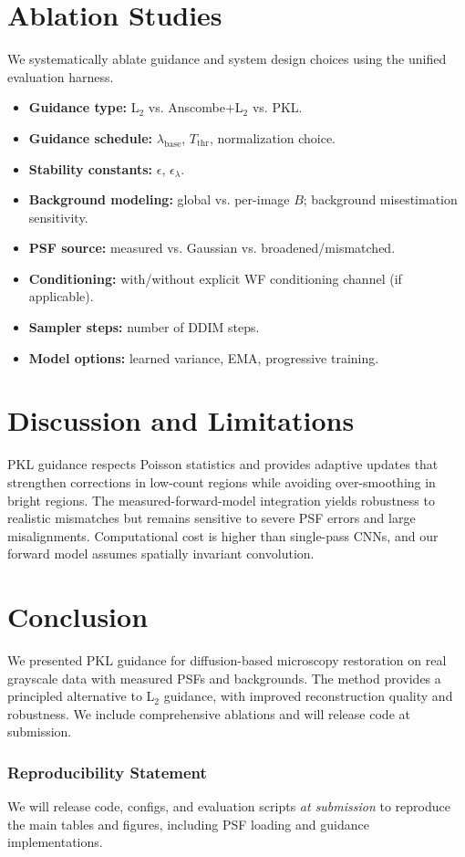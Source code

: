 \documentclass{article}
\newcommand{\wf}{WF\xspace}
\begin{document}
\section{Ablation Studies}
We systematically ablate guidance and system design choices using the unified evaluation harness.
\begin{itemize}
    \item \textbf{Guidance type:} L$_2$ vs. Anscombe+L$_2$ vs. PKL.
    \item \textbf{Guidance schedule:} $\lambda_{\text{base}}$, $T_{\text{thr}}$, normalization choice.
    \item \textbf{Stability constants:} $\epsilon$, $\epsilon_\lambda$.
    \item \textbf{Background modeling:} global vs. per-image $B$; background misestimation sensitivity.
    \item \textbf{PSF source:} measured vs. Gaussian vs. broadened/mismatched.
    \item \textbf{Conditioning:} with/without explicit \wf conditioning channel (if applicable).
    \item \textbf{Sampler steps:} number of DDIM steps.
    \item \textbf{Model options:} learned variance, EMA, progressive training.
\end{itemize}


\section{Discussion and Limitations}
\label{sec:limitations}
PKL guidance respects Poisson statistics and provides adaptive updates that strengthen corrections in low-count regions while avoiding over-smoothing in bright regions. The measured-forward-model integration yields robustness to realistic mismatches but remains sensitive to severe PSF errors and large misalignments. Computational cost is higher than single-pass CNNs, and our forward model assumes spatially invariant convolution.

\section{Conclusion}
\label{sec:conclusion}
We presented PKL guidance for diffusion-based microscopy restoration on real grayscale data with measured PSFs and backgrounds. The method provides a principled alternative to L$_2$ guidance, with improved reconstruction quality and robustness. We include comprehensive ablations and will release code at submission.

\subsubsection*{Reproducibility Statement}
We will release code, configs, and evaluation scripts \emph{at submission} to reproduce the main tables and figures, including PSF loading and guidance implementations.



\end{document}
